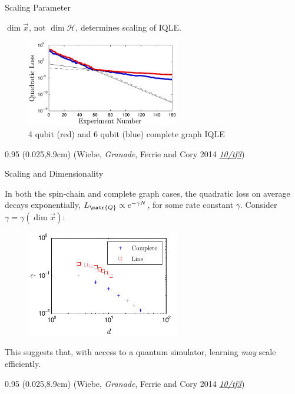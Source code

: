 \documentclass[xcolor=dvipsnames, compress]{beamer}
\renewcommand\UrlFont{\color{red}\rmfamily\itshape}
\newcommand{\shortdoi}[1]{\href{http://doi.org/#1}{\UrlFont 10/#1}}
\newcommand{\Hil}{\mathcal{H}}
\newcommand{\bottomnote}[1]{
  \begin{textblock*}{0.95\paperwidth} (0.025\paperwidth,8.9cm)
    {\tiny \hfill #1}
  \end{textblock*}
}
\begin{document}
\begin{frame}{Scaling Parameter}

  \begin{block}{}
     $\dim \vec{x}$, not $\dim \Hil$, determines scaling of IQLE.
  \end{block}

  \begin{figure}
    \centering
    \includegraphics[width=0.6\textwidth]{corner}
    \caption{4 qubit (red) and 6 qubit (blue) complete graph IQLE}
  \end{figure}

  \bottomnote{(Wiebe, \emph{Granade}, Ferrie and Cory 2014 \shortdoi{tf3})}

\end{frame}

\begin{frame}{Scaling and Dimensionality}

    In both the spin-chain and complete graph cases, the quadratic
    loss on average decays exponentially,
    \(
      L_{\matr{Q}} \propto e^{-\gamma N}
    \),
    for some rate constant $\gamma$.
    \pause
    Consider $\gamma = \gamma(\dim \vec{x})$:
    \begin{figure}
      \includegraphics[width=0.6\textwidth]{exp_scale}
    \end{figure}

    This suggests that, with access to a quantum simulator,
    learning \emph{may} scale efficiently.

  \bottomnote{(Wiebe, \emph{Granade}, Ferrie and Cory 2014 \shortdoi{tf3})}

\end{frame}
\end{document}
